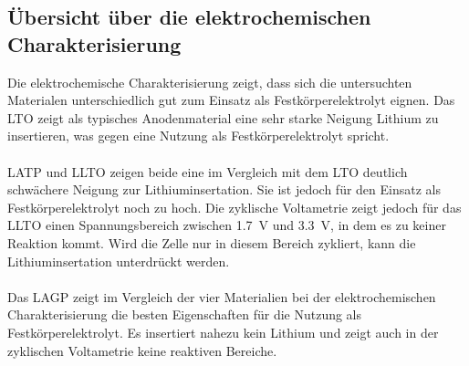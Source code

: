 \documentclass[a4paper, 11pt, headsepline,footsepline,twoside,abstract]{scrbook}
\begin{document}
\subsection{Übersicht über die elektrochemischen Charakterisierung}
Die elektrochemische Charakterisierung zeigt, dass sich die untersuchten Materialen unterschiedlich gut zum Einsatz als Festkörperelektrolyt eignen. Das LTO zeigt als typisches Anodenmaterial eine sehr starke Neigung Lithium zu insertieren, was gegen eine Nutzung als Festkörperelektrolyt spricht.
\\\\
LATP und LLTO zeigen beide eine im Vergleich mit dem LTO deutlich schwächere Neigung zur Lithiuminsertation. Sie ist jedoch für den Einsatz als Festkörperelektrolyt noch zu hoch. Die zyklische Voltametrie zeigt jedoch für das LLTO einen Spannungsbereich zwischen \SI{1,7}{\volt} und \SI{3,3}{\volt}, in dem es zu keiner Reaktion kommt. Wird die Zelle nur in diesem Bereich zykliert, kann die Lithiuminsertation unterdrückt werden.
\\\\
Das LAGP zeigt im Vergleich der vier Materialien bei der elektrochemischen Charakterisierung die besten Eigenschaften für die Nutzung als Festkörperelektrolyt. Es insertiert nahezu kein Lithium und zeigt auch in der zyklischen Voltametrie keine reaktiven Bereiche. 
\end{document}
